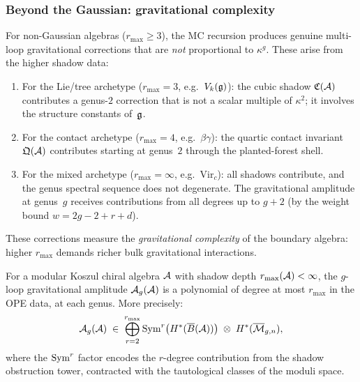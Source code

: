 \subsubsection{Beyond the Gaussian: gravitational complexity}

\begin{remark}
For non-Gaussian algebras ($r_{\max} \geq 3$), the MC recursion
produces genuine multi-loop gravitational corrections that are
\emph{not} proportional to $\kappa^g$. These arise from the
higher shadow data:
\begin{enumerate}[label=(\alph*)]
\item For the Lie/tree archetype ($r_{\max} = 3$,
 e.g.\ $V_k(\mathfrak{g})$): the cubic shadow $\mathfrak{C}(\mathcal{A})$
 contributes a genus-$2$ correction that is not a scalar
 multiple of $\kappa^2$; it involves the structure constants
 of~$\mathfrak{g}$.
\item For the contact archetype ($r_{\max} = 4$,
 e.g.\ $\beta\gamma$): the quartic contact invariant
 $\mathfrak{Q}(\mathcal{A})$ contributes starting at genus~$2$
 through the planted-forest shell.
\item For the mixed archetype ($r_{\max} = \infty$,
 e.g.\ $\mathrm{Vir}_c$): all shadows contribute, and
 the genus spectral sequence does not degenerate. The
 gravitational amplitude at genus~$g$ receives contributions
 from all degrees up to $g + 2$ (by the weight bound
 $w = 2g - 2 + r + d$).
\end{enumerate}
These corrections measure the \emph{gravitational complexity} of
the boundary algebra: higher $r_{\max}$ demands richer bulk
gravitational interactions.
\end{remark}

\begin{proposition}
For a modular Koszul chiral algebra $\mathcal{A}$ with shadow depth
$r_{\max}(\mathcal{A}) < \infty$, the $g$-loop gravitational
amplitude $\mathcal{A}_g(\mathcal{A})$ is a polynomial of degree
at most $r_{\max}$ in the OPE data, at each genus. More
precisely:
\begin{equation}%
\mathcal{A}_g(\cA)
\;\in\;
\bigoplus_{r=2}^{r_{\max}}
\Sym^r\bigl(H^*(\barB(\cA))\bigr)
\;\otimes\;
H^*(\overline{\cM}_{g,n}),
\end{equation}
where the $\operatorname{Sym}^r$ factor encodes the $r$-degree contribution
from the shadow obstruction tower, contracted with the tautological classes
of the moduli space.
\end{proposition}

